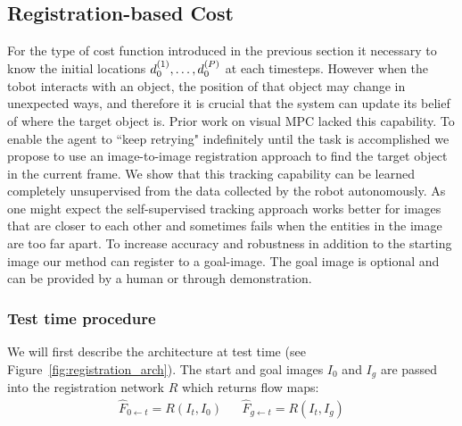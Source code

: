 \subsection{Registration-based Cost}
\label{subsec:reg_cost}
For the type of cost function introduced in the previous section it necessary to know the initial locations $d_0^{(1)}, \dots, d_0^{(P)}$ at each timesteps. However when the tobot interacts with an object, the position of that object may change in unexpected ways, and therefore it is crucial that the system can update its belief of where the target object is. Prior work on visual MPC lacked this capability. To enable the agent to ``keep retrying" indefinitely until the task is accomplished we propose to use an image-to-image registration approach to find the target object in the current frame. 
We show that this tracking capability can be learned completely unsupervised from the data collected by the robot autonomously. As one might expect the self-supervised tracking approach works better for images that are closer to each other and sometimes fails when the entities in the image are too far apart. To increase accuracy and robustness in addition to the starting image our method can register to a goal-image. The goal image is optional and can be provided by a human or through demonstration.

\subsubsection{Test time procedure}

We will first describe the architecture at test time (see Figure~\ref{fig:registration_arch}). The start and goal images $I_0$ and $I_g$ are passed into the registration network $R$ which returns flow maps:
\begin{align}
    \hat{F}_{0 \leftarrow t} = R(I_t, I_0) &&
    \hat{F}_{g \leftarrow t} = R(I_t, I_g)
\end{align}

